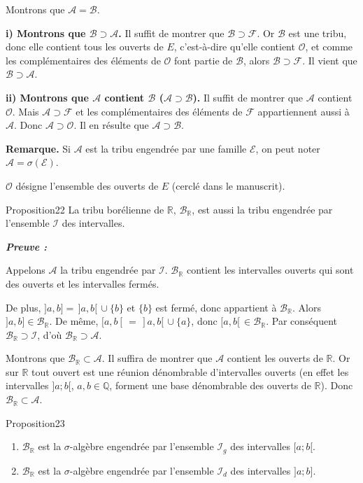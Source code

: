 \documentclass[11pt,a4paper]{article}
\newcommand{\R}{\mathbb{R}}
\newcommand{\Q}{\mathbb{Q}}
\newcommand{\A}{\mathscr{A}}
\newcommand{\B}{\mathscr{B}}
\newcommand{\Ee}{\mathscr{E}}
\newcommand{\Oo}{\mathscr{O}}
\newcommand{\Ff}{\mathscr{F}}
\newcommand{\Ii}{\mathscr{I}}
\newenvironment{preuve}{\par\textit{\textbf{Preuve :}}\par\nopagebreak[4]}{\par}
\begin{document}
Montrons que $\A=\B$.

\textbf{i) Montrons que $\B\supset\A$.} Il suffit de montrer que $\B\supset\Ff$.
Or $\B$ est une tribu, donc elle contient tous les ouverts de $E$, c'est-à-dire qu'elle contient $\Oo$,
et comme les complémentaires des éléments de $\Oo$ font partie de $\B$, alors $\B\supset\Ff$.
Il vient que $\B\supset\A$.

\textbf{ii) Montrons que $\A$ contient $\B$ ($\A\supset\B$).} Il suffit de montrer que $\A$ contient $\Oo$.
Mais $\A\supset\Ff$ et les complémentaires des éléments de $\Ff$ appartiennent aussi à $\A$. Donc $\A\supset\Oo$.
Il en résulte que $\A\supset\B$.

\textbf{\color{bleu}Remarque.} Si $\A$ est la tribu engendrée par une famille $\Ee$, on peut noter $\A=\sigma(\Ee)$.

\begin{note}
$\Oo$ désigne l'ensemble des ouverts de $E$ (cerclé dans le manuscrit).
\end{note}



\begin{enonce}{Proposition}{22}
La tribu borélienne de $\R$, $\B_{\R}$, est aussi la tribu engendrée par l'ensemble $\Ii$ des intervalles.
\end{enonce}

\begin{preuve}\end{preuve}
Appelons $\A$ la tribu engendrée par $\Ii$. $\B_{\R}$ contient les intervalles ouverts qui sont des ouverts
et les intervalles fermés.

De plus, $]a,b]=\,]a,b[\,\cup\{b\}$ et $\{b\}$ est fermé, donc appartient à $\B_{\R}$. Alors $]a,b]\in\B_{\R}$.
De même, $[a,b[\,=\,]a,b[\,\cup\{a\}$, donc $[a,b[\,\in\B_{\R}$.
Par conséquent $\B_{\R}\supset\Ii$, d'où $\B_{\R}\supset\A$.

Montrons que $\B_{\R}\subset\A$. Il suffira de montrer que $\A$ contient les ouverts de $\R$.
Or sur $\R$ tout ouvert est une réunion dénombrable d'intervalles ouverts
(en effet les intervalles $]a;b[$, $a,b\in\Q$, forment une base dénombrable des ouverts de $\R$).
Donc $\B_{\R}\subset\A$.



\begin{enonce}{Proposition}{23}
\begin{enumerate}[label=\textbf{\arabic*)},leftmargin=1.2cm]
  \item $\B_{\R}$ est la $\sigma$-algèbre engendrée par l'ensemble $\Ii_g$ des intervalles $[a;b[$.
  \item $\B_{\R}$ est la $\sigma$-algèbre engendrée par l'ensemble $\Ii_d$ des intervalles $]a;b]$.
\end{enumerate}
\end{enonce}
\end{document}
